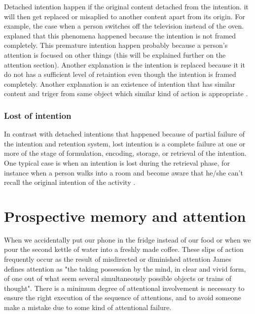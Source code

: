 Detached intention happen if the original content detached from the intention. it will then get replaced or misaplied to another content apart from
its origin.
 For example, the case when a person switches off the television instead of the oven. \citep{Reason1984} explaned that this phenomena happened because the intention is not framed completely.
This premature intention happen probably because a person's attention is focused on other things (this will be explained further on the attention section). Another explanation is the intention
is replaced because it it do not has a sufficient level of retaintion even though the intention is framed completely.
 Another explanation is an existence of intention that has similar content and triger from same object which similar kind of action is appropriate \citep{Reason1984}.


\subsubsection{Lost of intention}

In contrast with detached intentions that happened because of partial failure of the intention and retention system, lost intention
is a complete failure at one or more of the stage of formulation, encoding, storage, or retrieval of the intention.
One typical case is when an intention is lost during the retrieval phase, for instance when a person walks into a room and become aware that he/she can't recall the original intention of the activity \citep{Reason1984}.


\section{Prospective memory and attention}


When we accidentally put our phone in the fridge instead of our food or when we pour the second kettle of water into a freshly made coffee. These slips of action frequently occur as the result of misdirected or diminished attention \cite{Reason1984}
James defines attention as  "the taking possession by the mind, in clear and vivid form, of one out of what seem several simultaneously possible objects or trains of thought".
There is a minimum degree of attentional involvement is necessary to ensure the right execution of the sequence of attentions, and to avoid someone make a mistake due to some kind of attentional failure.

